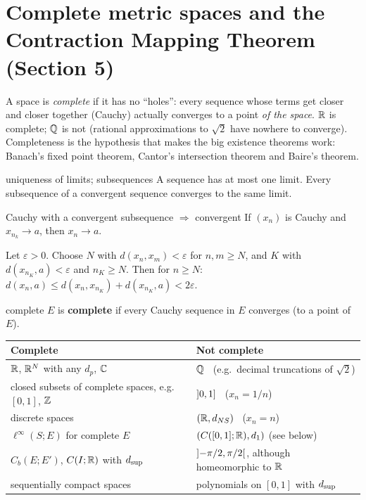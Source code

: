 \section{Complete metric spaces and the Contraction Mapping Theorem (Section 5)}

\begin{plain}
A space is \emph{complete} if it has no ``holes'': every sequence whose terms get closer and
closer together (Cauchy) actually converges to a point \emph{of the space}. $\mathbb R$ is complete;
$\mathbb Q$ is not (rational approximations to $\sqrt2$ have nowhere to converge). Completeness is the
hypothesis that makes the big existence theorems work: Banach's fixed point theorem, Cantor's
intersection theorem and Baire's theorem.
\end{plain}

\begin{thm}{uniqueness of limits; subsequences}
A sequence has at most one limit. Every subsequence of a convergent sequence converges to the
same limit.
\end{thm}
\begin{thm}{Cauchy with a convergent subsequence $\Rightarrow$ convergent}
If $(x_n)$ is Cauchy and $x_{n_k}\to a$, then $x_n\to a$.
\end{thm}
\begin{answer}
Let $\varepsilon>0$. Choose $N$ with $d(x_n,x_m)<\varepsilon$ for $n,m\ge N$, and $K$ with
$d(x_{n_K},a)<\varepsilon$ and $n_K\ge N$. Then for $n\ge N$:
$d(x_n,a)\le d(x_n,x_{n_K})+d(x_{n_K},a)<2\varepsilon$.
\end{answer}

\begin{defn}{complete}
$E$ is \textbf{complete} if every Cauchy sequence in $E$ converges (to a point of $E$).
\end{defn}
\begin{center}
\renewcommand{\arraystretch}{1.2}
\begin{tabular}{@{}ll@{}}\toprule
Complete & Not complete\\\midrule
$\mathbb R$, $\mathbb R^N$ with any $d_p$, $\mathbb C$ & $\mathbb Q$ \ (e.g.\ decimal truncations of $\sqrt2$)\\
closed subsets of complete spaces, e.g.\ $[0,1]$, $\mathbb Z$ & $\mathopen{]}0,1\mathclose{]}$ \ ($x_n=1/n$)\\
discrete spaces & $(\mathbb R,d_{NS})$ \ ($x_n=n$)\\
$\ell^\infty(S;E)$ for complete $E$ & $(C([0,1];\mathbb R),d_1)$ (see below)\\
$C_b(E;E')$, $C(I;\mathbb R)$ with $d_{\sup}$ & $\mathopen{]}-\pi/2,\pi/2\mathclose{[}$, although homeomorphic to $\mathbb R$\\
sequentially compact spaces & polynomials on $[0,1]$ with $d_{\sup}$\\\bottomrule
\end{tabular}
\end{center}

